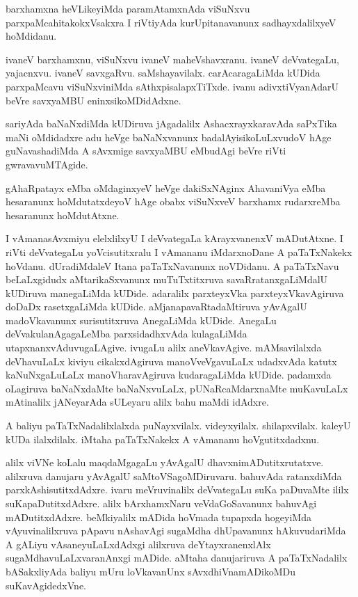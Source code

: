 \begin{mng}
barxhamxna heVLikeyiMda paramAtamxnAda viSuNxvu parxpaMcahitakokxVsakxra I riVtiyAda kurUpitanavanunx sadhayxdalilxyeV hoMdidanu.
\end{mng}

\begin{mng}
ivaneV barxhamxnu, viSuNxvu ivaneV maheVshavxranu. ivaneV deVvategaLu, yajacnxvu. ivaneV savxgaRvu. saMshayavilalx. carAcaragaLiMda kUDida parxpaMcavu viSuNxviniMda sAthxpisalapxTiTxde. ivanu adivxtiVyanAdarU beVre savxyaMBU eninxsikoMDidAdxne.
\end{mng}

\begin{mng}
sariyAda baNaNxdiMda kUDiruva jAgadalilx AshacxrayxkaravAda saPxTika maNi oMdidadxre adu heVge baNaNxvanunx badalAyisikoLuLxvudoV hAge guNavashadiMda A sAvxmige savxyaMBU eMbudAgi beVre riVti gwravavuMTAgide.
\end{mng}

\begin{mng}
gAhaRpatayx eMba oMdaginxyeV heVge dakiSxNAginx AhavaniVya eMba hesaranunx hoMdutatxdeyoV hAge obabx viSuNxveV barxhamx rudarxreMba hesaranunx hoMdutAtxne.
\end{mng}

\begin{mng}
I vAmanasAvxmiyu elelxlilxyU I deVvategaLa kArayxvanenxV mADutAtxne. I riVti deVvategaLu yoVcisutitxralu I vAmananu iMdarxnoDane A paTaTxNakekx hoVdanu. dUradiMdaleV Itana paTaTxNavanunx noVDidanu. A paTaTxNavu beLaLxgidudx aMtarikaSxvanunx muTuTxtitxruva savaRratanxgaLiMdalU kUDiruva manegaLiMda kUDide. adaralilx parxteyxVka parxteyxVkavAgiruva doDaDx rasetxgaLiMda kUDide. aMjanapavaRtadaMtiruva yAvAgalU madoVkavanunx surisutitxruva AnegaLiMda kUDide. AnegaLu deVvakulanAgagaLeMba parxsidadhxvAda kulagaLiMda utapxnanxvAduvugaLAgive. ivugaLu alilx aneVkavAgive. mAMsavilalxda deVhavuLaLx kiviyu cikakxdAgiruva manoVveVgavuLaLx udadxvAda katutx kaNuNxgaLuLaLx manoVharavAgiruva kudaragaLiMda kUDide. padamxda oLagiruva baNaNxdaMte baNaNxvuLaLx, pUNaRcaMdarxnaMte muKavuLaLx mAtinalilx jANeyarAda sULeyaru alilx bahu maMdi idAdxre.
\end{mng}

\begin{mng}
A baliyu paTaTxNadalilxlalxda puNayxvilalx. videyxyilalx. shilapxvilalx. kaleyU kUDa ilalxdilalx. iMtaha paTaTxNakekx A vAmananu hoVgutitxdadxnu.
\end{mng}

\begin{mng}
alilx viVNe koLalu maqdaMgagaLu yAvAgalU dhavxnimADutitxrutatxve. alilxruva danujaru yAvAgalU saMtoVSagoMDiruvaru. bahuvAda ratanxdiMda parxkAshisutitxdAdxre. ivaru meVruvinalilx deVvategaLu suKa paDuvaMte ililx suKapaDutitxdAdxre. alilx bArxhamxNaru veVdaGoSavanunx bahuvAgi mADutitxdAdxre. beMkiyalilx mADida hoVmada tupapxda hogeyiMda vAyuvinalilxruva pApavu nAshavAgi sugaMdha dhUpavanunx hAkuvudariMda A gALiyu vAsaneyuLaLxdAdxgi alilxruva deYtayxranenxlAlx sugaMdhavuLaLxvaranAnxgi mADide. aMtaha danujariruva A paTaTxNadalilx bASakxliyAda baliyu mUru loVkavanUnx sAvxdhiVnamADikoMDu suKavAgidedxVne. 
\end{mng}

